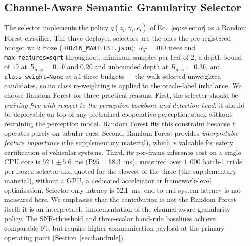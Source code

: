 \documentclass[journal]{IEEEtran}
\begin{document}
\subsection{Channel-Aware Semantic Granularity Selector}\label{sec:selector}

The selector implements the policy $g(z_t,\hat\gamma_t,c_t)$ of Eq.~\eqref{eq:selector} as a Random Forest classifier. The three deployed selectors are the ones the pre-registered budget walk froze (\texttt{FROZEN\_MANIFEST.json}): $N_T=400$ trees and \texttt{max\_features=sqrt} throughout, minimum samples per leaf of $2$, a depth bound of $10$ at $B_{\max}=0.10$ and $0.20$ and unbounded depth at $B_{\max}=0.30$, and \texttt{class\_weight=None} at all three budgets --- the walk selected unweighted candidates, so no class re-weighting is applied to the oracle-label imbalance. We choose Random Forest for three practical reasons. First, the selector should be \emph{training-free with respect to the perception backbone and detection head}: it should be deployable on top of any pretrained cooperative perception stack without retraining the perception model. Random Forest fits this constraint because it operates purely on tabular cues. Second, Random Forest provides \emph{interpretable feature importance} (the supplementary material), which is valuable for safety certification of vehicular systems. Third, its per-frame inference cost on a single CPU core is $52.1 \pm 5.6$~ms ($\mathrm{P95} = 58.3$~ms), measured over $1{,}000$ batch-1 trials per frozen selector and quoted for the slowest of the three (the supplementary material), without a GPU, a dedicated accelerator or framework-level optimisation. Selector-only latency is $52.1$~ms; end-to-end system latency is not measured here. We emphasise that the contribution is not the Random Forest itself: it is an interpretable implementation of the channel-aware granularity policy. The SNR-threshold and three-scalar hand-rule baselines achieve comparable F1, but require higher communication payload at the primary operating point (Section~\ref{sec:handrule}).
\end{document}
